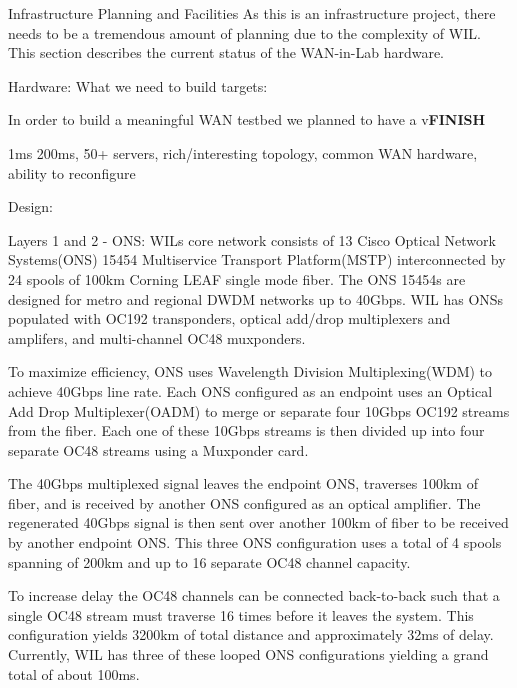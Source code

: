 \documentclass{IEEEtran}
\begin{document}
\begin{section}{Infrastructure Planning and Facilities}
As this is an infrastructure project, there needs to be a tremendous
amount of planning due to the complexity of WIL.  This section describes
the current status of the WAN-in-Lab hardware.

\begin{subsection}{Hardware: What we need to build targets:}

In order to build a meaningful WAN testbed we planned to have a v{\bf FINISH}

1ms  200ms, 50+ servers, rich/interesting topology, common WAN hardware,
ability to reconfigure
\end{subsection}

\begin{subsection}{Design:}
\begin{subsubsection}{Layers 1 and 2 - ONS:}
WILs core network consists of 13 Cisco Optical Network Systems(ONS)
15454 Multiservice Transport Platform(MSTP) interconnected by 24 spools
of 100km Corning LEAF single mode fiber. The ONS 15454s are designed for
metro and regional DWDM networks up to 40Gbps. WIL has ONSs populated
with OC192 transponders, optical add/drop multiplexers and amplifers,
and multi-channel OC48 muxponders.

To maximize efficiency, ONS uses Wavelength Division Multiplexing(WDM)
to achieve 40Gbps line rate. Each ONS configured as an endpoint uses
an Optical Add Drop Multiplexer(OADM) to merge or separate four 10Gbps
OC192 streams from the fiber. Each one of these 10Gbps streams is then
divided up into four separate OC48 streams using a Muxponder card.

The 40Gbps multiplexed signal leaves the endpoint ONS, traverses 100km
of fiber, and is received by another ONS configured as an optical
amplifier. The regenerated 40Gbps signal is then sent over another
100km of fiber to be received by another endpoint ONS. This three ONS
configuration uses a total of 4 spools spanning of 200km and up to 16
separate OC48 channel capacity.

To increase delay the OC48 channels can be connected back-to-back such
that a single OC48 stream must traverse 16 times before it leaves
the system. This configuration yields 3200km of total distance and
approximately 32ms of delay. Currently, WIL has three of these looped
ONS configurations yielding a grand total of about 100ms.
\end{subsubsection}


\end{subsection}
\end{section}
\end{document}
